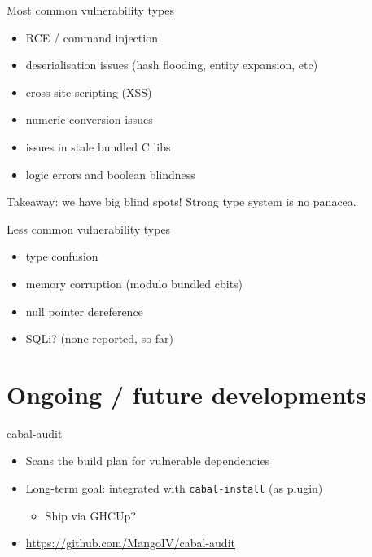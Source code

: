 \documentclass[ignorenonframetext,aspectratio=169,12pt]{beamer}
\begin{document}
\begin{frame}{Most common vulnerability types}
  \begin{itemize}
    \item RCE / command injection
    \item deserialisation issues (hash flooding, entity expansion, etc)
    \item cross-site scripting (XSS)
    \item numeric conversion issues
    \item issues in stale bundled C libs
    \item logic errors and boolean blindness
  \end{itemize}

  Takeaway: we have big blind spots!  Strong type system is no
  panacea.
\end{frame}

\begin{frame}{Less common vulnerability types}
  \begin{itemize}
    \item type confusion
    \item memory corruption (modulo bundled cbits)
    \item null pointer dereference
    \item SQLi? (none reported, so far)
  \end{itemize}
\end{frame}

\section{Ongoing / future developments}

\begin{frame}{cabal-audit}
  \begin{itemize}
    \item Scans the build plan for vulnerable dependencies
    \item Long-term goal: integrated with {\tt cabal-install} (as
      plugin)
      \begin{itemize}
        \item Ship via GHCUp?
      \end{itemize}
    \item \url{https://github.com/MangoIV/cabal-audit}
  \end{itemize}
\end{frame}

\begin{frame}[plain]
  \begin{center}
  \end{center}
\end{frame}
\end{document}
